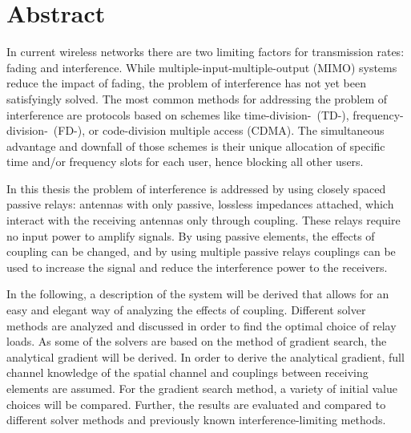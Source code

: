\chapter*{Abstract}

In current wireless networks there are two limiting factors for transmission rates: fading and interference.
While multiple-input-multiple-output (MIMO) systems reduce the impact of fading, the problem of interference has not yet been satisfyingly solved.
The most common methods for addressing the problem of interference are protocols based on schemes like time-division-~(TD-), frequency-division-~(FD-), or code-division multiple access (CDMA).
The simultaneous advantage and downfall of those schemes is their unique allocation of specific time and/or frequency slots for each user, hence blocking all other users.

In this thesis the problem of interference is addressed by using closely spaced passive relays: antennas with only passive, lossless impedances attached, which interact with the receiving antennas only through coupling.
These relays require no input power to amplify signals.
By using passive elements, the effects of coupling can be changed, and by using multiple passive relays couplings can be used to increase the signal and reduce the interference power to the receivers.

In the following, a description of the system will be derived that allows for an easy and elegant way of analyzing the effects of coupling.
Different solver methods are analyzed and discussed in order to find the optimal choice of relay loads.
As some of the solvers are based on the method of gradient search, the analytical gradient will be derived.
In order to derive the analytical gradient, full channel knowledge of the spatial channel and couplings between receiving elements are assumed.
For the gradient search method, a variety of initial value choices will be compared.
Further, the results are evaluated and compared to different solver methods and previously known interference-limiting methods.
